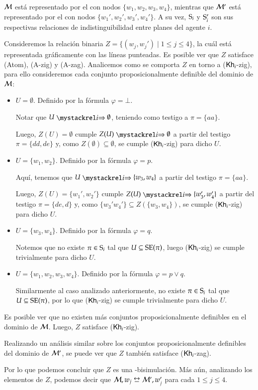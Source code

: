 \begin{ejemplo}
    $\modults$ está representado por el \ults con nodos $\{w_1,w_2,w_3,w_4\}$, mientras que $\modults'$ está representado 
    por el \ults con nodos $\{w_1',w_2',w_3',w_4'\}$. A su vez, $\S_i$ y $\S'_i$ son sus respectivas relaciones de indistinguibilidad 
    entre planes del agente $i$.

    Consideremos la relación binaria $Z = \{(w_j, w_j') \mid 1 \leq j \leq 4\}$, la cuál está representada gráficamente con las líneas 
    punteadas. Es posible ver que $Z$ satisface (Atom), (A-zig) y (A-zag). Analicemos como se comporta $Z$ en torno a ($\khi$-zig), para ello 
    consideremos cada conjunto proposicionalmente definible del dominio de $\modults$:
    \begin{itemize}
       \item $U = \emptyset$. Definido por la fórmula $\varphi = \bot$.

       Notar que $U \ultsExecAgi \emptyset$, teniendo como testigo a $\pi = \{aa\}$.

       Luego, $Z(U) = \emptyset$ cumple $Z(U) \ultsExecAgi \emptyset$ a partir del testigo $\pi = \{dd,de\}$ y, 
       como $Z(\emptyset) \subseteq \emptyset$, se cumple ($\khi$-zig) para dicho $U$.
       \item $U = \{w_1,w_2\}$. Definido por la fórmula $\varphi = p$.
       
       Aquí, tenemos que $U \ultsExecAgi \{w_3,w_4\}$ a partir del testigo $\pi = \{aa\}$.

       Luego, $Z(U) = \{w_1',w_2'\}$ cumple $Z(U) \ultsExecAgi \{w_3',w_4'\}$ a partir del testigo $\pi = \{de,d\}$ y, 
       como $\{w_3'w_4'\} \subseteq Z(\{w_3,w_4\})$, se cumple ($\khi$-zig) para dicho $U$.
       \item $U = \{w_3,w_4\}$. Definido por la fórmula $\varphi = q$.
       
       Notemos que no existe $\pi \in \S_i$ tal que $U \subseteq \sexec(\pi)$, luego ($\khi$-zig) se cumple trivialmente para dicho $U$.
       \item $U = \{w_1,w_2,w_3,w_4\}$. Definido por la fórmula $\varphi = p \vee q$. 
       
       Similarmente al caso analizado anteriormente, no existe $\pi \in \S_i$ tal que $U \subseteq \sexec(\pi)$, por lo que ($\khi$-zig) se 
       cumple trivialmente para dicho $U$.
    \end{itemize}
    Es posible ver que no existen más conjuntos proposicionalmente definibles en el dominio de $\modults$. Luego, $Z$ satisface ($\khi$-zig).
    
    Realizando un análisis similar sobre los conjuntos proposicionalmente definibles del dominio de $\modults'$, se puede ver que $Z$ también 
    satisface ($\khi$-zag).
    
    Por lo que podemos concluir que $Z$ es una \KHilogic-bisimulación. Más aún, analizando los elementos de $Z$, podemos decir que 
    $\modults,w_j \bisim \modults',w_j'$ para cada $1 \leq j \leq 4$. 
\end{ejemplo}


